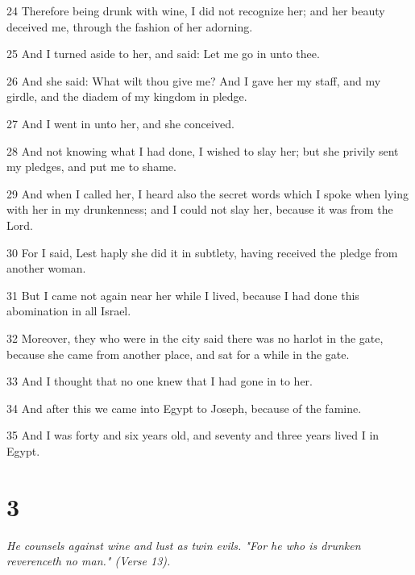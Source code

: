 \par 24 Therefore being drunk with wine, I did not recognize her; and her beauty deceived me, through the fashion of her adorning.

\par 25 And I turned aside to her, and said: Let me go in unto thee.

\par 26 And she said: What wilt thou give me? And I gave her my staff, and my girdle, and the diadem of my kingdom in pledge.

\par 27 And I went in unto her, and she conceived.

\par 28 And not knowing what I had done, I wished to slay her; but she privily sent my pledges, and put me to shame.

\par 29 And when I called her, I heard also the secret words which I spoke when lying with her in my drunkenness; and I could not slay her, because it was from the Lord.

\par 30 For I said, Lest haply she did it in subtlety, having received the pledge from another woman.

\par 31 But I came not again near her while I lived, because I had done this abomination in all Israel.

\par 32 Moreover, they who were in the city said there was no harlot in the gate, because she came from another place, and sat for a while in the gate.

\par 33 And I thought that no one knew that I had gone in to her.

\par 34 And after this we came into Egypt to Joseph, because of the famine.

\par 35 And I was forty and six years old, and seventy and three years lived I in Egypt.

\chapter{3}

\par \textit{He counsels against wine and lust as twin evils. "For he who is drunken reverenceth no man." (Verse 13).}

